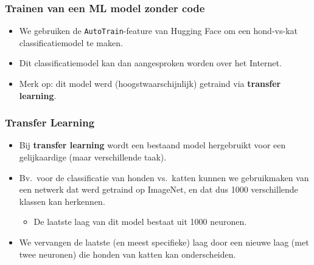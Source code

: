 \documentclass[aspectratio=169]{beamer}
\begin{document}
%
%




\begin{frame}
\frametitle{Trainen van een ML model zonder code}
\begin{itemize}
\item  We gebruiken de \texttt{AutoTrain}-feature van Hugging Face om een hond-vs-kat classificatiemodel
te maken.
\item Dit classificatiemodel kan dan aangesproken worden over het Internet.
\item Merk op: dit model werd (hoogstwaarschijnlijk) getraind via \textbf{transfer learning}.
\end{itemize}
\end{frame}

\begin{frame}
\frametitle{Transfer Learning}
\begin{itemize}
\item Bij \textbf{transfer learning} wordt een bestaand model hergebruikt voor een gelijkaardige (maar verschillende taak).
\item Bv.\ voor de classificatie van honden vs.\ katten kunnen we gebruikmaken van een netwerk 
dat werd getraind op ImageNet, en dat dus 1000 verschillende  klassen kan herkennen.
\begin{itemize}
	\item De laatste laag van dit model bestaat uit 1000 neuronen.
\end{itemize}
\item We vervangen de laatste (en meest specifieke) laag door een nieuwe laag (met twee neuronen)
 die honden van katten kan onderscheiden.
\end{itemize}
\end{frame}
\end{document}
